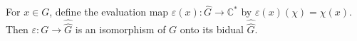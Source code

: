 For $x \in G$, define the evaluation map $\varepsilon(x): \widehat{G} \to \mathbb{C}^*$ by $\varepsilon(x)(\chi) = \chi(x)$. Then $\varepsilon: G \to \widehat{\widehat{G}}$ is an isomorphism of $G$ onto its bidual $\widehat{\widehat{G}}$.
